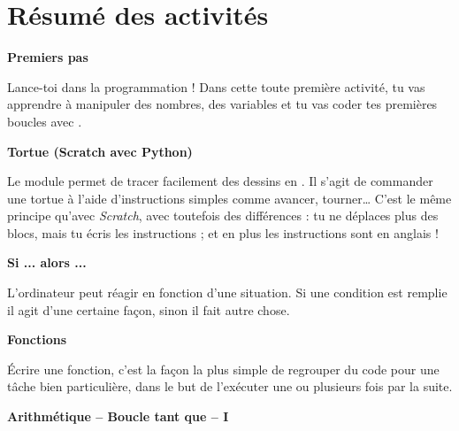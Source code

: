 \vspace*{\fill}



\cleardoublepage
\thispagestyle{empty}
\tableofcontents


\newpage


\section*{Résumé des activités}


\newcommand{\titreactivite}[1]{{\textbf{#1}}\nopagebreak}
\newcommand{\descriptionactivite}[1]{%
\smallskip\hfill
\begin{minipage}{0.95\textwidth}\small#1\end{minipage}\medskip\smallskip}

\titreactivite{Premiers pas}

\descriptionactivite{Lance-toi dans la programmation ! Dans cette toute première activité, tu vas apprendre à manipuler des nombres, des variables et tu vas coder tes premières boucles avec \Python.}

\titreactivite{Tortue (Scratch avec Python)}

\descriptionactivite{Le module 
 permet de tracer facilement des dessins en \Python{}. Il s'agit de commander une tortue à l'aide d'instructions simples comme \og{}avancer\fg{}, \og{}tourner\fg{}\ldots{} C'est le même principe qu'avec \emph{Scratch}, avec toutefois des différences : tu ne déplaces plus des blocs, mais tu écris les instructions ; et en plus les instructions sont en anglais !}

\titreactivite{Si ... alors ...}

\descriptionactivite{L'ordinateur peut réagir en fonction d'une situation. 
Si une condition est remplie il agit d'une certaine façon, 
sinon il fait autre chose.}

\titreactivite{Fonctions}

\descriptionactivite{\'Ecrire une fonction, c'est la façon la plus simple de regrouper du code pour une tâche bien particulière, dans le but de l'exécuter une ou plusieurs fois par la suite.}

\titreactivite{Arithmétique -- Boucle tant que -- I}

